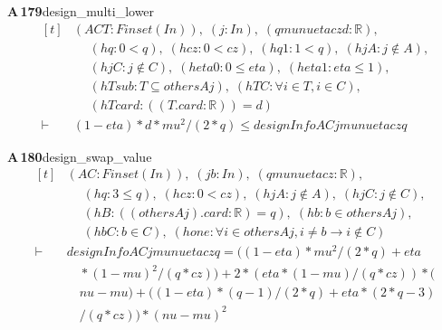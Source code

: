 \documentclass[conference]{IEEEtran}
\theoremstyle{definition}
\newcommand{\lean}[1]{\textsf{\footnotesize #1}}
\begin{document}
\noindent\textbf{A\,179}\quad\lean{design\_multi\_lower}
{\footnotesize\[ \begin{aligned}[t]
&(\mathit{A} \mathit{C} \mathit{T} : \mathit{Finset} (\mathit{I} \mathit{n})),\; (\mathit{j} : \mathit{I} \mathit{n}),\; (\mathit{q} \mathit{mu} \mathit{nu} \mathit{eta} \mathit{cz} \mathit{d} : \mathbb{R} ),\\
&\quad \; (\mathit{hq} : 0 < \mathit{q}),\; (\mathit{hcz} : 0 < \mathit{cz}),\; (\mathit{hq1} : 1 < \mathit{q}),\; (\mathit{hjA} : \mathit{j} \notin \mathit{A}),\\
&\quad \; (\mathit{hjC} : \mathit{j} \notin \mathit{C}),\; (\mathit{heta0} : 0 \leq \mathit{eta}),\; (\mathit{heta1} : \mathit{eta} \leq 1),\\
&\quad \; (\mathit{hTsub} : \mathit{T} \subseteq \mathit{others} \mathit{A} \mathit{j}),\; (\mathit{hTC} : \forall \mathit{i} \in \mathit{T}, \mathit{i} \in \mathit{C}),\\
&\quad \; (\mathit{hTcard} : ((\mathit{T}.\mathit{card} : \mathbb{R} )) = \mathit{d})\\
\vdash\;&(1-\mathit{eta})*\mathit{d}*\mathit{mu}^{2}/(2*\mathit{q}) \leq \mathit{designInfo} \mathit{A} \mathit{C} \mathit{j} \mathit{mu} \mathit{nu} \mathit{eta} \mathit{cz} \mathit{q}
\end{aligned} \]}

\noindent\textbf{A\,180}\quad\lean{design\_swap\_value}
{\footnotesize\[ \begin{aligned}[t]
&(\mathit{A} \mathit{C} : \mathit{Finset} (\mathit{I} \mathit{n})),\; (\mathit{j} \mathit{b} : \mathit{I} \mathit{n}),\; (\mathit{q} \mathit{mu} \mathit{nu} \mathit{eta} \mathit{cz} : \mathbb{R} ),\\
&\quad \; (\mathit{hq} : 3 \leq \mathit{q}),\; (\mathit{hcz} : 0 < \mathit{cz}),\; (\mathit{hjA} : \mathit{j} \notin \mathit{A}),\; (\mathit{hjC} : \mathit{j} \notin \mathit{C}),\\
&\quad \; (\mathit{hB} : ((\mathit{others} \mathit{A} \mathit{j}).\mathit{card} : \mathbb{R} ) = \mathit{q}),\; (\mathit{hb} : \mathit{b} \in \mathit{others} \mathit{A} \mathit{j}),\\
&\quad \; (\mathit{hbC} : \mathit{b} \in \mathit{C}),\; (\mathit{hone} : \forall \mathit{i} \in \mathit{others} \mathit{A} \mathit{j}, \mathit{i} \neq \mathit{b} \to \mathit{i} \notin \mathit{C})\\
\vdash\;&\mathit{designInfo} \mathit{A} \mathit{C} \mathit{j} \mathit{mu} \mathit{nu} \mathit{eta} \mathit{cz} \mathit{q} = ((1-\mathit{eta})*\mathit{mu}^{2}/(2*\mathit{q})+\mathit{eta}\\
&\quad *(1-\mathit{mu})^{2}/(\mathit{q}*\mathit{cz})) + 2*(\mathit{eta}*(1-\mathit{mu})/(\mathit{q}*\mathit{cz}))*(\\
&\quad \mathit{nu}-\mathit{mu}) + ((1-\mathit{eta})*(\mathit{q}-1)/(2*\mathit{q})+\mathit{eta}*(2*\mathit{q}-3)\\
&\quad /(\mathit{q}*\mathit{cz}))*(\mathit{nu}-\mathit{mu})^{2}
\end{aligned} \]}
\end{document}
